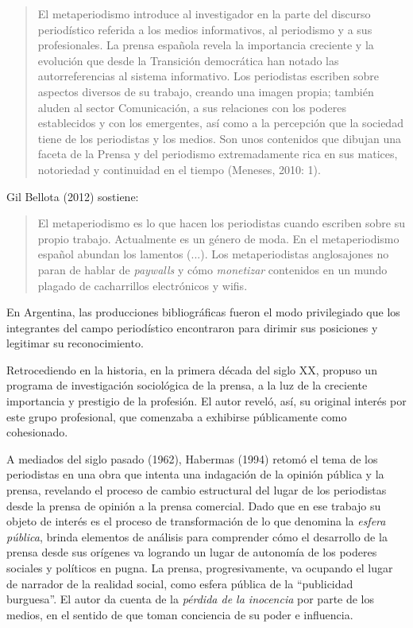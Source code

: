 \begin{quote}
	El metaperiodismo introduce al investigador en la parte del discurso periodístico referida a los medios informativos, al periodismo y a sus profesionales. La prensa española revela la importancia creciente y la evolución que desde la Transición democrática han notado las autorreferencias al sistema informativo. Los periodistas escriben sobre aspectos diversos de su trabajo, creando una imagen propia; también aluden al sector Comunicación, a sus relaciones con los poderes establecidos y con los emergentes, así como a la percepción que la sociedad tiene de los periodistas y los medios. Son unos contenidos que dibujan una faceta de la Prensa y del periodismo extremadamente rica en sus matices, notoriedad y continuidad en el tiempo (Meneses, 2010: 1).
\end{quote}


Gil Bellota (2012) sostiene:

\begin{quote}
	El metaperiodismo es lo que hacen los periodistas cuando escriben sobre su propio trabajo. Actualmente es un género de moda. En el metaperiodismo español abundan los lamentos (...). Los metaperiodistas anglosajones no paran de hablar de \emph{paywalls} y cómo \emph{monetizar} contenidos en un mundo plagado de cacharrillos electrónicos y wifis.
\end{quote}


En Argentina, las producciones bibliográficas fueron el modo privilegiado que los integrantes del campo periodístico encontraron para dirimir sus posiciones y legitimar su reconocimiento.

Retrocediendo en la historia, en la primera década del siglo XX, \textcite{@6976-WEBER1992} propuso un programa de investigación sociológica de la prensa, a la luz de la creciente importancia y prestigio de la profesión. El autor reveló, así, su original interés por este grupo profesional, que comenzaba a exhibirse públicamente como cohesionado.

A mediados del siglo pasado (1962), Habermas (1994) retomó el tema de los periodistas en una obra que intenta una indagación de la opinión pública y la prensa, revelando el proceso de cambio estructural del lugar de los periodistas desde la prensa de opinión a la prensa comercial. Dado que en ese trabajo su objeto de interés es el proceso de transformación de lo que denomina la \emph{esfera pública}, brinda elementos de análisis para comprender cómo el desarrollo de la prensa desde sus orígenes va logrando un lugar de autonomía de los poderes sociales y políticos en pugna. La prensa, progresivamente, va ocupando el lugar de narrador de la realidad social, como esfera pública de la ``publicidad burguesa''. El autor da cuenta de la \emph{pérdida de la inocencia} por parte de los medios, en el sentido de que toman conciencia de su poder e influencia.

